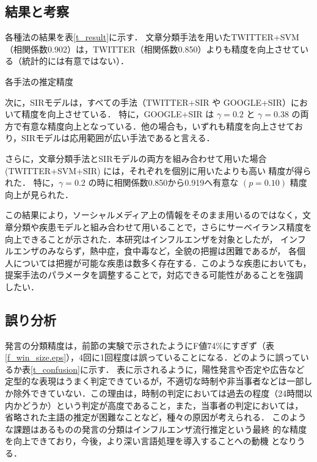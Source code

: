 \documentclass[japanese]{jnlp_1.4}
\begin{document}
\subsection{結果と考察}

各種法の結果を表\ref{t_result}に示す．
文章分類手法を用いたTWITTER+SVM（相関係数0.902）は，TWITTER（相関係数0.850）よりも精度を向上させている（統計的には有意ではない）．

\begin{table}[b]
\caption{各手法の推定精度}
\label{t_result}

\end{table}

次に，SIRモデルは，すべての手法（TWITTER+SIR や GOOGLE+SIR）において精度を向上させている．
特に，GOOGLE+SIR は $\gamma=0.2$ と $\gamma=0.38$ の両方で有意な精度向上となっている．他の場合も，いずれも精度を向上させており，SIRモデルは応用範囲が広い手法であると言える．

さらに，文章分類手法とSIRモデルの両方を組み合わせて用いた場合
(TWITTER+SVM+SIR) には，それぞれを個別に用いたよりも高い
精度が得られた．
特に，$\gamma=0.2$ の時に相関係数0.850から0.919へ有意な $(p=0.10)$ 精度向上が見られた．

この結果により，ソーシャルメディア上の情報をそのまま用いるのではなく，文章分類や疾患モデルと組み合わせて用いることで，さらにサーベイランス精度を向上できることが示された．本研究はインフルエンザを対象としたが，
インフルエンザのみならず，熱中症，食中毒など，全貌の把握は困難であるが，
各個人については把握が可能な疾患は数多く存在する．このような疾患においても，
提案手法のパラメータを調整することで，対応できる可能性があることを強調
したい．



\subsection{誤り分析}

発言の分類精度は，前節の実験で示されたようにF値74\%にすぎず（表\ref{f_win_size.eps}），4回に1回程度は誤っていることになる．どのように誤っているか表\ref{t_confusion}に示す．
表に示されるように，陽性発言や否定や広告など定型的な表現はうまく判定できているが，不適切な時制や非当事者などは一部しか除外できていない．この理由は，時制の判定においては過去の程度（24時間以内かどうか）という判定が高度であること，また，当事者の判定においては，
省略された主語の推定が困難なことなど，種々の原因が考えられる．
このような課題はあるものの発言の分類はインフルエンザ流行推定という最終
的な精度を向上できており，今後，より深い言語処理を導入することへの動機
となりうる．
\end{document}
